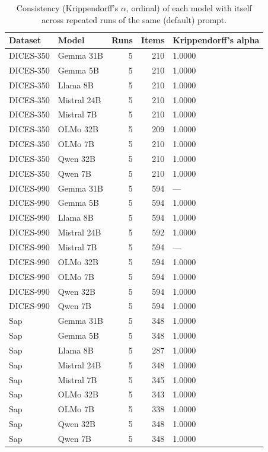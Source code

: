 \begin{table}[t]
\centering
\caption{Consistency (Krippendorff's $\alpha$, ordinal) of each model with itself across repeated runs of the same (default) prompt.}
\label{tab:llm-consistency-repeats}
\begin{tabular}{llrrl}
\toprule
Dataset & Model & Runs & Items & Krippendorff's alpha \\
\midrule
DICES-350 & Gemma 31B & 5 & 210 & 1.0000 \\
DICES-350 & Gemma 5B & 5 & 210 & 1.0000 \\
DICES-350 & Llama 8B & 5 & 210 & 1.0000 \\
DICES-350 & Mistral 24B & 5 & 210 & 1.0000 \\
DICES-350 & Mistral 7B & 5 & 210 & 1.0000 \\
DICES-350 & OLMo 32B & 5 & 209 & 1.0000 \\
DICES-350 & OLMo 7B & 5 & 210 & 1.0000 \\
DICES-350 & Qwen 32B & 5 & 210 & 1.0000 \\
DICES-350 & Qwen 7B & 5 & 210 & 1.0000 \\
DICES-990 & Gemma 31B & 5 & 594 & --- \\
DICES-990 & Gemma 5B & 5 & 594 & 1.0000 \\
DICES-990 & Llama 8B & 5 & 594 & 1.0000 \\
DICES-990 & Mistral 24B & 5 & 592 & 1.0000 \\
DICES-990 & Mistral 7B & 5 & 594 & --- \\
DICES-990 & OLMo 32B & 5 & 594 & 1.0000 \\
DICES-990 & OLMo 7B & 5 & 594 & 1.0000 \\
DICES-990 & Qwen 32B & 5 & 594 & 1.0000 \\
DICES-990 & Qwen 7B & 5 & 594 & 1.0000 \\
Sap & Gemma 31B & 5 & 348 & 1.0000 \\
Sap & Gemma 5B & 5 & 348 & 1.0000 \\
Sap & Llama 8B & 5 & 287 & 1.0000 \\
Sap & Mistral 24B & 5 & 348 & 1.0000 \\
Sap & Mistral 7B & 5 & 345 & 1.0000 \\
Sap & OLMo 32B & 5 & 343 & 1.0000 \\
Sap & OLMo 7B & 5 & 338 & 1.0000 \\
Sap & Qwen 32B & 5 & 348 & 1.0000 \\
Sap & Qwen 7B & 5 & 348 & 1.0000 \\

\end{tabular}
\end{table}
